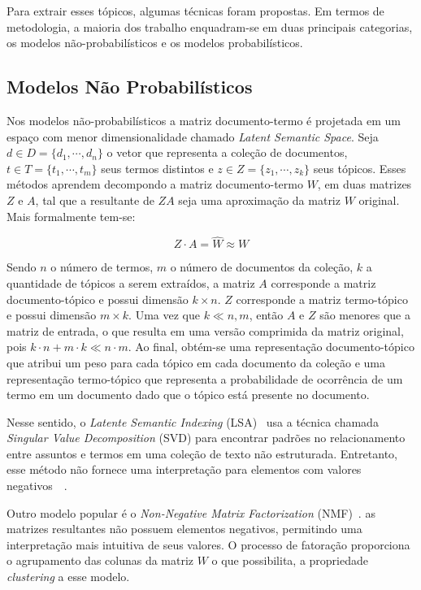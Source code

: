 Para extrair esses tópicos, algumas técnicas foram propostas. Em termos de metodologia, a maioria dos trabalho enquadram-se em duas principais categorias, os modelos não-probabilísticos e os modelos probabilísticos.


\subsection{Modelos Não Probabilísticos}

Nos modelos não-probabilísticos a matriz documento-termo é projetada em um espaço com menor dimensionalidade chamado \textit{Latent Semantic Space}. 
Seja
$d \in D = \{d_1,\cdots,d_n\}$ o vetor que representa a coleção de documentos, 
$t \in T = \{t_1,\cdots,t_m\}$ seus termos distintos e 
$z \in Z = \{z_1,\cdots,z_k\}$ seus tópicos. 
Esses métodos aprendem decompondo a matriz documento-termo $W$, em duas matrizes $Z$ e $A$, tal que a resultante de $ZA$ seja uma aproximação da matriz $W$ original. Mais formalmente tem-se:

\begin{equation}
	Z\cdot A = \hat{W} \approx W
\end{equation}

Sendo $n$ o número de termos, $m$ o número de documentos da coleção, $k$ a quantidade de tópicos a serem extraídos, a matriz $A$ corresponde a matriz documento-tópico e possui dimensão $k \times n$. $Z$ corresponde a matriz termo-tópico e possui dimensão $m \times k$. Uma vez que $k \ll n,m$, então $A$ e $Z$ são menores que a matriz de entrada, o que resulta em uma versão comprimida da matriz original, pois $k \cdot n + m \cdot k \ll n \cdot m$. Ao final, obtém-se uma representação documento-tópico que atribui um peso para cada tópico em cada documento da coleção e uma representação termo-tópico que representa a probabilidade de ocorrência de um termo em um documento dado que o tópico está presente no documento.

Nesse sentido, o \textit{Latente Semantic Indexing} (LSA)~\cite{Deerwester1990} usa a técnica chamada \textit{Singular Value Decomposition} (SVD) para encontrar padrões no relacionamento entre assuntos e termos em uma coleção de texto não estruturada. Entretanto, esse método não fornece uma interpretação para elementos com valores negativos~\cite{Deerwester1990}~\cite{Cheng2013}. %

Outro modelo popular é o \textit{Non-Negative Matrix Factorization} (NMF)~\cite{Lee1999}.  
as matrizes resultantes não possuem elementos negativos, permitindo uma interpretação mais intuitiva de seus valores. O processo de fatoração proporciona o agrupamento das colunas da matriz $W$ o que possibilita, a propriedade \textit{clustering} a esse modelo.



